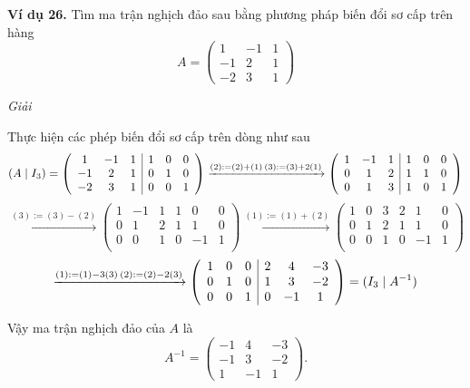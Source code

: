 \textbf{Ví dụ 26.} Tìm ma trận nghịch đảo sau bằng phương pháp biến đổi sơ cấp trên hàng
\[
A = \begin{pmatrix}
1 & -1 & 1 \\
-1 & 2 & 1 \\
-2 & 3 & 1
\end{pmatrix}
\]

\textit{Giải}

Thực hiện các phép biến đổi sơ cấp trên dòng như sau
\[
\left( A \mid I_3 \right) = \left( \begin{array}{ccc|ccc}
1 & -1 & 1 & 1 & 0 & 0 \\
-1 & 2 & 1 & 0 & 1 & 0 \\
-2 & 3 & 1 & 0 & 0 & 1 \\
\end{array} \right)
\xrightarrow{(2) := (2) + (1) \\ (3) := (3) + 2(1)}
\left( \begin{array}{ccc|ccc}
1 & -1 & 1 & 1 & 0 & 0 \\
0 & 1 & 2 & 1 & 1 & 0 \\
0 & 1 & 3 & 1 & 0 & 1 \\
\end{array} \right)
\]
\[
\xrightarrow{(3) := (3) - (2)}
\left( \begin{array}{ccc|ccc}
1 & -1 & 1 & 1 & 0 & 0 \\
0 & 1 & 2 & 1 & 1 & 0 \\
0 & 0 & 1 & 0 & -1 & 1 \\
\end{array} \right)
\xrightarrow{(1) := (1) + (2)}
\left( \begin{array}{ccc|ccc}
1 & 0 & 3 & 2 & 1 & 0 \\
0 & 1 & 2 & 1 & 1 & 0 \\
0 & 0 & 1 & 0 & -1 & 1 \\
\end{array} \right)
\]
\[
\xrightarrow{(1) := (1) - 3(3) \\ (2) := (2) - 2(3)}
\left( \begin{array}{ccc|ccc}
1 & 0 & 0 & 2 & 4 & -3 \\
0 & 1 & 0 & 1 & 3 & -2 \\
0 & 0 & 1 & 0 & -1 & 1 \\
\end{array} \right) = (I_3 \mid A^{-1})
\]

Vậy ma trận nghịch đảo của \(A\) là
\[
A^{-1} = \begin{pmatrix}
-1 & 4 & -3 \\
-1 & 3 & -2 \\
1 & -1 & 1
\end{pmatrix}.
\]

